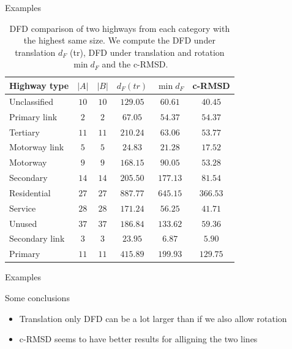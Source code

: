 \documentclass{beamer}
\begin{document}
\begin{frame}{Examples}
  \begin{small}
    \begin{table}
      \caption{DFD comparison of two highways from each category with the highest same size. We compute the DFD under translation $d_F$ (tr), DFD under translation and rotation $\min d_F$ and the c-RMSD.}
      \label{table:2}
      \begin{tabular}{ l | c c c c c }
        Highway type & $|A|$ & $|B|$ & $d_F (tr)$ & $\min d_F$ & c-RMSD\\
        \hline
        Unclassified & $10$ & $10$ & $129.05$ & $60.61$ & $40.45$\\
        Primary link & $2$ & $2$ & $67.05$ & $54.37$ & $54.37$\\
        Tertiary & $11$ & $11$ & $210.24$ & $63.06$ & $53.77$\\
        Motorway link & $5$ & $5$ & $24.83$ & $21.28$ & $17.52$\\
        Motorway & $9$ & $9$ & $168.15$ & $90.05$ & $53.28$\\
        Secondary & $14$ & $14$ & $205.50$ & $177.13$ & $81.54$\\
        Residential & $27$ & $27$ & $887.77$ & $645.15$ & $366.53$\\
        Service & $28$ & $28$ & $171.24$ & $56.25$ & $41.71$\\
        Unused & $37$ & $37$ & $186.84$ & $133.62$ & $59.36$\\
        Secondary link & $3$ & $3$ & $23.95$ & $6.87$ & $5.90$\\
        Primary & $11$ & $11$ & $415.89$ & $199.93$ & $129.75$\\
      \end{tabular}
    \end{table}
  \end{small}
\end{frame}

\begin{frame}{Examples}
  \begin{block}{Some conclusions}
    \begin{itemize}
      \item Translation only DFD can be a lot larger than if we also allow rotation
      \item c-RMSD seems to have better results for alligning the two lines
    \end{itemize}
  \end{block}
\end{frame}
\end{document}
